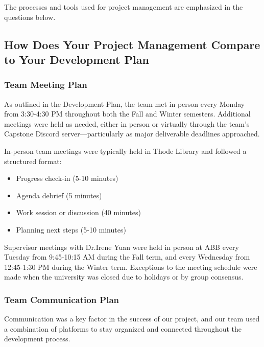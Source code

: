 \documentclass{article}
\begin{document}
\hspace{2em} The processes and tools used for project management are emphasized in the questions below.

\subsection{How Does Your Project Management Compare to Your Development Plan}

\subsubsection{Team Meeting Plan}

\hspace{2em}As outlined in the Development Plan, the team met in person every Monday from 3:30-4:30 PM throughout both the Fall and Winter semesters. Additional meetings were held as needed, either in person or virtually through the team's Capstone Discord server—particularly as major deliverable deadlines approached.

In-person team meetings were typically held in Thode Library and followed a structured format:
\begin{itemize}
    \item Progress check-in (5-10 minutes)
    \item Agenda debrief (5 minutes)
    \item Work session or discussion (40 minutes)
    \item Planning next steps (5-10 minutes)
\end{itemize}

Supervisor meetings with Dr.Irene Yuan were held in person at ABB every Tuesday from 9:45-10:15 AM during the Fall term, and every Wednesday from 12:45-1:30 PM during the Winter term. Exceptions to the meeting schedule were made when the university was closed due to holidays or by group consensus.

\subsubsection{Team Communication Plan}

\hspace{2em}Communication was a key factor in the success of our project, and our team used a combination of platforms to stay organized and connected throughout the development process.
\end{document}
